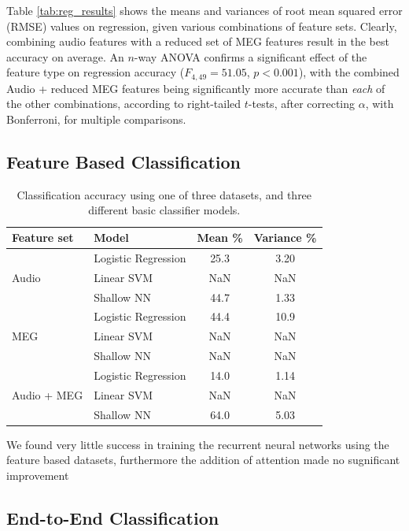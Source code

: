 \documentclass[utf8]{frontiersSCNS} %
\begin{document}
Table \ref{tab:reg_results} shows the means and variances of root mean squared error (RMSE) values on regression, given various combinations of feature sets. Clearly, combining audio features with a reduced set of MEG features result in the best accuracy on average. An $n$-way ANOVA confirms a significant effect of the feature type on regression accuracy ($F_{4,49} = 51.05$, $p<0.001$), with the combined Audio + reduced MEG features being significantly more accurate than {\em each} of the other combinations, according to right-tailed $t$-tests, after correcting $\alpha$, with Bonferroni, for multiple comparisons.

\subsection{Feature Based Classification}

\begin{table}[t]
  \centering
  \label{tab:feat_results}
  \begin{tabular}{l l | c | c}
    \textbf{Feature set} & Model & \textbf{Mean \%} & \textbf{Variance \%} \\
    \toprule
    \multirow{3}{*}{Audio}
    & Logistic Regression & 25.3 & 3.20  \\
    & Linear SVM          & NaN & NaN  \\
    & Shallow NN          & 44.7 & 1.33  \\
    \midrule
    \multirow{3}{*}{MEG}
    & Logistic Regression & 44.4 & 10.9  \\
    & Linear SVM          & NaN & NaN  \\
    & Shallow NN          & NaN & NaN  \\
    \midrule
    \multirow{3}{*}{Audio + MEG}
    & Logistic Regression & 14.0 & 1.14  \\
    & Linear SVM          & NaN & NaN  \\
    & Shallow NN          & 64.0 & 5.03  \\
    \bottomrule
  \end{tabular}
  \caption{Classification accuracy using one of three datasets, and three different basic classifier models.}
\end{table}

We found very little success in training the recurrent neural networks using the feature based datasets, furthermore the addition of attention made no sugnificant improvement 
  

\subsection{End-to-End Classification}
\end{document}
